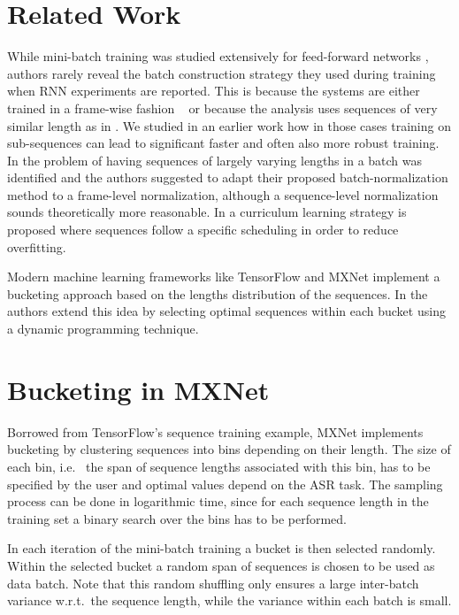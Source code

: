 \documentclass{article}
\begin{document}
  \section{Related Work} \label{sec:related}
  	While mini-batch training was studied extensively for feed-forward networks \cite{Li16}, authors rarely reveal the batch construction strategy they used during training when 
  	RNN experiments are reported. This is because the systems are either trained in a frame-wise
  	fashion ~\cite{2016arXiv161005256X} or because the analysis uses sequences of very similar length as in \cite{PascanuMB13}. We studied in an earlier work \cite{Doetsch14} how in those cases training on sub-sequences can lead to significant faster and often also more robust training. 
  	In \cite{Laurent16} the problem of having sequences of largely varying lengths in a batch was identified and the authors
  	suggested to adapt their proposed batch-normalization method to a frame-level normalization, 
  	although a sequence-level normalization sounds theoretically more reasonable. In \cite{Bengio15} a curriculum learning strategy is proposed where sequences follow a specific scheduling in order to reduce overfitting.
  	
  	Modern machine learning frameworks like TensorFlow \cite{tensorflow} and 
  	MXNet \cite{mxnet} implement a bucketing approach based on the lengths distribution of the sequences. In \cite{Khomenko06} the authors extend this idea by selecting optimal sequences within each bucket using a dynamic programming technique.

  \section{Bucketing in MXNet} \label{sec:bucketing}
  Borrowed from TensorFlow's sequence training example, MXNet implements bucketing by 
  clustering sequences into bins depending on their length. The size of each bin, i.e.~ the span of 
  sequence lengths associated with this bin, has to be specified by the user and optimal values 
  depend on the ASR task. The sampling process can be done in logarithmic time, since for each sequence length in the training set a binary search over the bins has to be performed. 
    
  In each iteration of the mini-batch training a bucket is then selected randomly. Within the selected bucket a random span of sequences is chosen to be used as data batch. Note that this random shuffling only ensures a large inter-batch variance w.r.t.~the sequence length, while the variance 
  within each batch is small.
  
\end{document}
